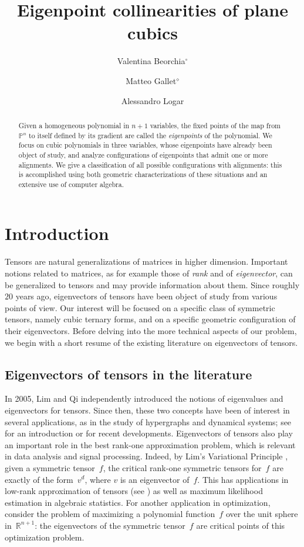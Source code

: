 \documentclass[a4paper, 11pt, reqno]{amsart}
\title{Eigenpoint collinearities of plane cubics}
\author[Valentina Beorchia]{Valentina Beorchia$^{\circ}$}
\author[Matteo Gallet]{Matteo Gallet$^{\diamond}$}
\author[Alessandro Logar]{Alessandro Logar}
\date{}
\theoremstyle{plain}
\theoremstyle{definition}
\newcommand{\R}{\mathbb{R}}
\newcommand{\p}{\mathbb{P}}
\begin{document}
\begin{abstract}
 Given a homogeneous polynomial in $n+1$ variables, the fixed points of the map from $\p^n$ to itself defined by its gradient are called the \emph{eigenpoints} of the polynomial. We focus on cubic polynomials in three variables, whose eigenpoints have already been object of study, and analyze configurations of eigenpoints that admit one or more alignments. We give a classification of all possible configurations with alignments: this is accomplished using both geometric characterizations of these situations and an extensive use of computer algebra.
\end{abstract}

\maketitle


\section{Introduction}
\label{introduction}

Tensors are natural generalizations of matrices in higher dimension.
Important notions related to matrices, as for example those of \emph{rank} and of \emph{eigenvector},
can be generalized to tensors and may provide information about them.
Since roughly $20$ years ago, eigenvectors of tensors have been object of study from various points of view.
Our interest will be focused on a specific class of symmetric tensors, namely cubic ternary forms, and on a specific geometric configuration of their eigenvectors.
Before delving into the more technical aspects of our problem,
we begin with a short resume of the existing literature on eigenvectors of tensors.

\subsection*{Eigenvectors of tensors in the literature}
In 2005, Lim \cite{Lim} and Qi \cite{Qi} independently introduced the notions of eigenvalues and eigenvectors for tensors.
Since then, these two concepts have been of interest in several applications,
as in the study of hypergraphs and dynamical systems;
see \cite[Section~4]{QZ} for an introduction or \cite{GMV} for recent developments.
Eigenvectors of tensors also play an important role in the best rank-one approximation problem,
which is relevant in data analysis and signal processing. 
Indeed, by Lim's Variational Principle \cite{Lim}, given a symmetric tensor~$f$, the critical rank-one symmetric tensors for~$f$ are exactly of the form~$v^d$, where $v$ is an eigenvector of~$f$.
This has applications in low-rank approximation of tensors (see \cite{OttSod}) as well as maximum likelihood estimation in algebraic statistics.
For another application in optimization, consider the problem of maximizing a polynomial function~$f$ over the unit sphere in~$\R^{n+1}$: 
the eigenvectors of the symmetric tensor~$f$ are critical points of this optimization problem.
\end{document}
